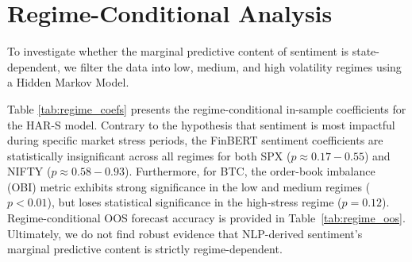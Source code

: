 \section{Regime-Conditional Analysis}
\label{sec:regime}
To investigate whether the marginal predictive content of sentiment is state-dependent, we filter the data into low, medium, and high volatility regimes using a Hidden Markov Model. 

Table \ref{tab:regime_coefs} presents the regime-conditional in-sample coefficients for the HAR-S model. Contrary to the hypothesis that sentiment is most impactful during specific market stress periods, the FinBERT sentiment coefficients are statistically insignificant across all regimes for both SPX ($p \approx 0.17 - 0.55$) and NIFTY ($p \approx 0.58 - 0.93$). Furthermore, for BTC, the order-book imbalance (OBI) metric exhibits strong significance in the low and medium regimes ($p < 0.01$), but loses statistical significance in the high-stress regime ($p=0.12$). Regime-conditional OOS forecast accuracy is provided in Table~\ref{tab:regime_oos}. Ultimately, we do not find robust evidence that NLP-derived sentiment's marginal predictive content is strictly regime-dependent.


